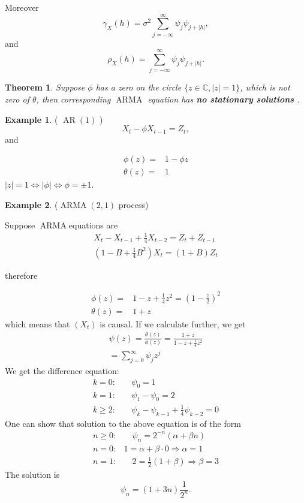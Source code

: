 \documentclass[12pt,a4paper, notitlepage]{book}
\theoremstyle{definition} %
\newtheorem{example}{Example}[chapter]
\theoremstyle{plain} %
\newtheorem{theorem}{Theorem}
\newcommand{\C}{\mathbb C}
\DeclareMathOperator{\Arma}{ARMA}
\DeclareMathOperator{\Ar}{AR}
\begin{document}
Moreover 
\[ \gamma _X (h) = \sigma ^2 \sum _{j= - \infty } ^{\infty} \psi _j \psi _{j+|h|} , \]
and 
\[ \rho _X(h) = \sum _{j=-\infty} ^{\infty} \psi _j \psi _{j + |h| } . \]


\endproof


\begin{theorem}
Suppose $ \phi $ has a zero on the circle $ \{ z\in \C , |z | = 1 \} $, which is not zero of $ \theta $, then corresponding $ \Arma $ equation has {\bf no stationary solutions }.
\end{theorem}

\begin{example} ( $ \Ar(1) $ )
\[ X_t - \phi X_{t-1} = Z_t , \]
and 

\begin{align*}
\phi(z)  =& 1 - \phi z \\
\theta(z) =& 1
\end{align*}
$ |z| = 1 \iff | \phi |  \iff \phi = \pm 1 $.
\end{example}


\begin{example} ($\Arma(2,1) $ process)

Suppose $ \Arma $equations are
\begin{align*}
X_t - X_{t-1} + \frac{1}{4} X_{t-2} = Z_t + Z_{t-1} \\
(1 - B + \frac{1}{4} B^2 ) X_t = (1 + B) Z_t 
\end{align*}

therefore

\begin{align*}
\phi(z) = & 1 - z + \frac{1}{4} z^2 = (1 - \frac{z}{2} ) ^2 \\
\theta (z) = & 1 + z
\end{align*}
which means that $ (X_t ) $ is causal. 
If we calculate further, we get
\begin{align*} 
\psi (z) = \frac{\theta(z) } { \phi(z)} = \frac{1+z}{  1 - z + \frac{1}{4} z^2 } \\
= \sum_{j=0} ^{\infty} \psi _j z^j 
\end{align*}
We get the difference equation:
\begin{align*}
k= 0 : & \quad \psi _0 = 1 \\
k=1 : & \quad \psi _1 - \psi _0 = 2 \\
k \geq 2 : & \quad \psi _k - \psi _{k-1} + \frac{1}{4} \psi _{k-2} = 0
\end{align*}
One can show that solution to the above equation is of the form
\begin{align*}
n \geq 0 : & \quad \psi _n = 2^{-n} \left( \alpha + \beta n \right)  \\
n = 0 : & 1 = \alpha + \beta \cdot 0 \Rightarrow \alpha = 1 \\
n = 1 : & \quad 2 = \frac{1}{2} ( 1 + \beta) \Rightarrow \beta = 3 
\end{align*}
The solution is
\[ \psi _n = (1 + 3 n) \frac{1}{2^n} . \]
\end{example}
\end{document}
